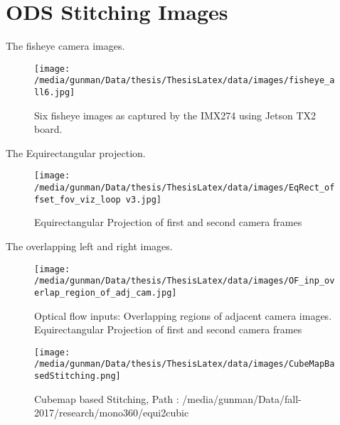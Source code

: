 \chapter{ODS Stitching Images}


The fisheye camera images.

\begin{figure*}
	\begin{center}
		\texttt{[image: /media/gunman/Data/thesis/ThesisLatex/data/images/fisheye\_all6.jpg]}
		\caption{Six fisheye images as captured by the IMX274 using Jetson TX2 board.}
		\label{ODS_Input_Output}
	\end{center}
	\vspace{-0.3in}
\end{figure*} 

The Equirectangular projection.

\begin{figure*}
	\begin{center}
		\texttt{[image: /media/gunman/Data/thesis/ThesisLatex/data/images/EqRect\_offset\_fov\_viz\_loop v3.jpg]}
		\caption{Equirectangular Projection of first and second camera frames}
		\label{ODS_Input_Ouput}
	\end{center}
	\vspace{-0.3in}
\end{figure*} 

The overlapping left and right images.
\begin{figure*}
	\begin{center}
		\texttt{[image: /media/gunman/Data/thesis/ThesisLatex/data/images/OF\_inp\_overlap\_region\_of\_adj\_cam.jpg]}
		\caption{Optical flow inputs: Overlapping regions of adjacent camera images. Equirectangular Projection of first and second camera frames}
		\label{ODS_Input_Ouput}
	\end{center}
	\vspace{-0.3in}
\end{figure*} 


\begin{figure*}
	\begin{center}
		\texttt{[image: /media/gunman/Data/thesis/ThesisLatex/data/images/CubeMapBasedStitching.png]}
		\caption{Cubemap based Stitching, Path : /media/gunman/Data/fall-2017/research/mono360/equi2cubic}
		\label{ODS_Input_Output}
	\end{center}
	\vspace{-0.3in}
\end{figure*} 

